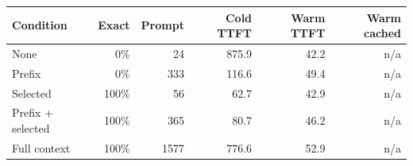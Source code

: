\begin{tabular}{lrrrrr}
\toprule
Condition & Exact & Prompt & Cold TTFT & Warm TTFT & Warm cached \\
\midrule
None & 0\% & 24 & 875.9 & 42.2 & n/a \\
Prefix & 0\% & 333 & 116.6 & 49.4 & n/a \\
Selected & 100\% & 56 & 62.7 & 42.9 & n/a \\
Prefix + selected & 100\% & 365 & 80.7 & 46.2 & n/a \\
Full context & 100\% & 1577 & 776.6 & 52.9 & n/a \\
\bottomrule
\end{tabular}
